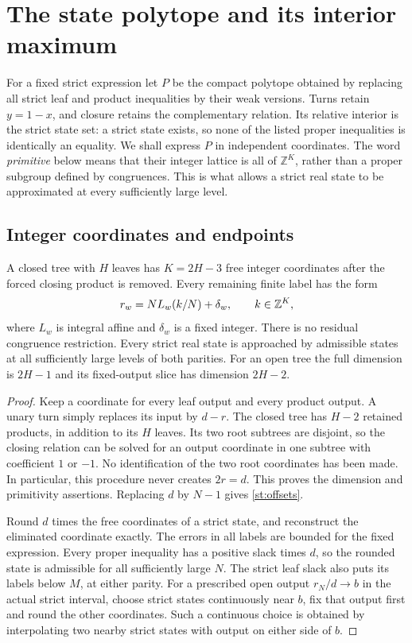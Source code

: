 \section{The state polytope and its interior maximum}\label{st:variation}\label{nt:variational}
For a fixed strict expression let $P$ be the compact polytope
obtained by replacing all strict leaf and product inequalities
by their weak versions. Turns retain $y=1-x$, and closure
retains the complementary relation. Its relative interior is
the strict state set: a strict state exists, so none of the
listed proper inequalities is identically an equality.
We shall express $P$ in independent coordinates. The word
\emph{primitive} below means that their integer lattice is all of
$\mathbb Z^K$, rather than a proper subgroup defined by congruences.
This is what allows a strict real state to be approximated at every
sufficiently large level.

\subsection{Integer coordinates and endpoints}
\begin{lemma}\label{st:lattice}
A closed tree with $H$ leaves has $K=2H-3$ free integer
coordinates after the forced closing product is removed.
Every remaining finite label has the form
\begin{equation}\label{st:offsets}
 r_w=NL_w(k/N)+\delta_w,\qquad k\in\mathbb Z^K,
\end{equation}
where $L_w$ is integral affine and $\delta_w$ is a fixed
integer. There is no residual congruence restriction.
Every strict real state is approached by admissible states
at all sufficiently large levels of both parities.
For an open tree the full dimension is $2H-1$ and its
fixed-output slice has dimension $2H-2$.
\end{lemma}
\begin{proof}
Keep a coordinate for every leaf output and every product
output. A unary turn simply replaces its input by $d-r$.
The closed tree has $H-2$ retained products, in addition
to its $H$ leaves. Its two root subtrees are disjoint,
so the closing relation can be solved for an output
coordinate in one subtree with coefficient $1$ or $-1$.
No identification of the two root coordinates has been
made. In particular, this procedure never creates $2r=d$.
This proves the dimension and primitivity assertions.
Replacing $d$ by $N-1$ gives \eqref{st:offsets}.

Round $d$ times the free coordinates of a strict state,
and reconstruct the eliminated coordinate exactly.
The errors in all labels are bounded for the fixed
expression. Every proper inequality has a positive
slack times $d$, so the rounded state is admissible
for all sufficiently large $N$. The strict leaf slack
also puts its labels below $M$, at either parity.
For a prescribed open output $r_N/d\to b$ in the actual
strict interval, choose strict states continuously
near $b$, fix that output first and round the other
coordinates. Such a continuous choice is obtained by
interpolating two nearby strict states with output
on either side of $b$.
\end{proof}

